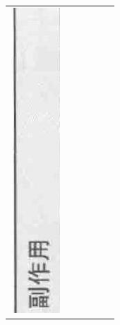 \documentclass[10pt]{article}
\begin{document}
\begin{center}
\begin{tabular}{|c|c|c|c|c|c|}
\hline
\includegraphics[max width=\textwidth]{2024_07_05_645bb794a4d4f32ee0c8g-352(19)}

\end{tabular}
\end{center}
\end{document}
